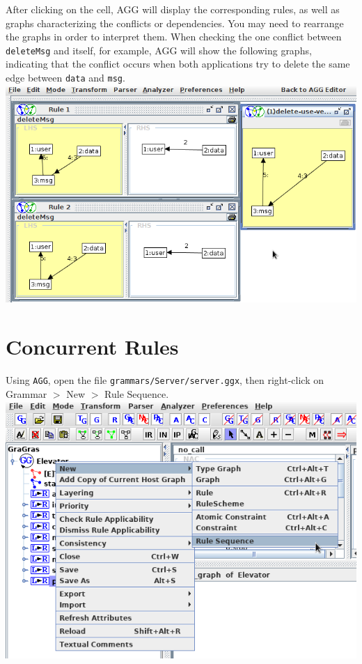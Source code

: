\documentclass[12pt]{article}
\newenvironment{tutorialstep}
	{\hspace{-\parindent}\begin{minipage}{\textwidth}}
    {\vspace{.3cm}\end{minipage}}
\begin{document}
\begin{tutorialstep}
After clicking on the cell, AGG will display the corresponding rules, as well as graphs characterizing the conflicts or dependencies. You may need to rearrange the graphs in order to interpret them. When checking the one conflict between \texttt{deleteMsg} and itself, for example, AGG will show the following graphs, indicating that the conflict occurs when both applications try to delete the same edge between \texttt{data} and \texttt{msg}. \\

\noindent
\centering
\includegraphics[scale = 0.5]{cpa_04.png}
\end{tutorialstep}

\pagebreak

\section{Concurrent Rules}

\begin{tutorialstep}
  Using \texttt{AGG}, open the file \texttt{grammars/Server/server.ggx}, then right-click on Grammar $>$ New $>$ Rule Sequence. \\

  \noindent
  \centering
  \includegraphics[scale = 0.6]{rule-sequence_01.png}
\end{tutorialstep}
\end{document}
